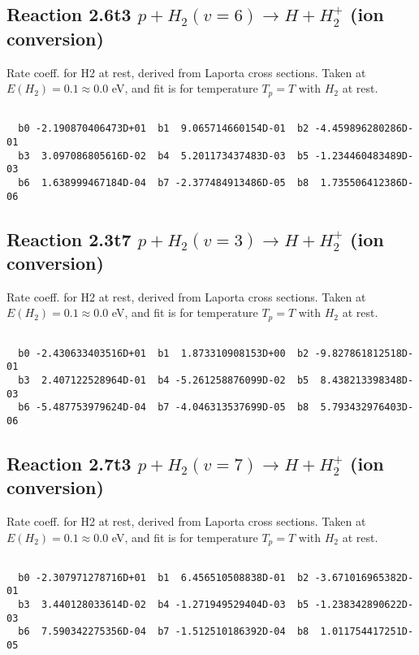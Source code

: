 \documentclass[12pt,dvipdfmx]{article}
\begin{document}
\newpage
\subsection{
Reaction 2.6t3
$ p + H_2(v=6) \rightarrow H + H_2^+$ (ion conversion)
}
Rate coeff. for H2 at rest, derived from Laporta cross sections.
Taken at $E(H_2) = 0.1 \approx 0.0$ eV,  and fit is for temperature $T_p=T$ with $H_2$ at rest.

\begin{small}\begin{verbatim}

  b0 -2.190870406473D+01  b1  9.065714660154D-01  b2 -4.459896280286D-01
  b3  3.097086805616D-02  b4  5.201173437483D-03  b5 -1.234460483489D-03
  b6  1.638999467184D-04  b7 -2.377484913486D-05  b8  1.735506412386D-06

\end{verbatim}\end{small}

\newpage
\subsection{
Reaction 2.3t7
$ p + H_2(v=3) \rightarrow H + H_2^+$ (ion conversion)
}
Rate coeff. for H2 at rest, derived from Laporta cross sections.
Taken at $E(H_2) = 0.1 \approx 0.0$ eV,  and fit is for temperature $T_p=T$ with $H_2$ at rest.

\begin{small}\begin{verbatim}

  b0 -2.430633403516D+01  b1  1.873310908153D+00  b2 -9.827861812518D-01
  b3  2.407122528964D-01  b4 -5.261258876099D-02  b5  8.438213398348D-03
  b6 -5.487753979624D-04  b7 -4.046313537699D-05  b8  5.793432976403D-06

\end{verbatim}\end{small}

\newpage
\subsection{
Reaction 2.7t3
$ p + H_2(v=7) \rightarrow H + H_2^+$ (ion conversion)
}
Rate coeff. for H2 at rest, derived from Laporta cross sections.
Taken at $E(H_2) = 0.1 \approx 0.0$ eV,  and fit is for temperature $T_p=T$ with $H_2$ at rest.

\begin{small}\begin{verbatim}

  b0 -2.307971278716D+01  b1  6.456510508838D-01  b2 -3.671016965382D-01
  b3  3.440128033614D-02  b4 -1.271949529404D-03  b5 -1.238342890622D-03
  b6  7.590342275356D-04  b7 -1.512510186392D-04  b8  1.011754417251D-05

\end{verbatim}\end{small}
\end{document}
